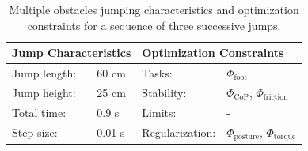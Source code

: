 \begin{table}[t]
\centering
\caption[Multiple obstacles jumping characteristics and optimization constraints]{Multiple obstacles jumping characteristics and optimization constraints for a sequence of three successive jumps.}
\begin{tabular}{|ll|ll|}
\hline
\multicolumn{2}{|l|}{\textbf{Jump Characteristics}} & \multicolumn{2}{l|}{\textbf{Optimization Constraints}} \\ \hline
Jump length:& 60 cm 	& Tasks: 			& $\Phi_{\text{foot}}$ \\ \hline
Jump height:& 25 cm	& Stability:    		& $\Phi_{\text{CoP}}$, $\Phi_{\text{friction}}$\\ \hline
Total time:& 0.9 s 	& Limits: 			& - \\ \hline
Step size:& 0.01 s 	& Regularization: 	& $\Phi_{\text{posture}}$, $\Phi_{\text{torque}}$\\ \hline
\end{tabular}
\label{tab:jumpObstacles}
\end{table}

